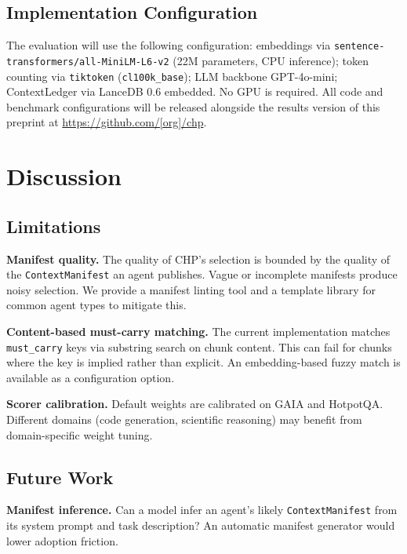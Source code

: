 \documentclass[11pt]{article}
\begin{document}
\subsection{Implementation Configuration}

The evaluation will use the following configuration:
embeddings via \texttt{sentence-transformers/all-MiniLM-L6-v2} (22M
parameters, CPU inference); token counting via \texttt{tiktoken}
(\texttt{cl100k\_base}); LLM backbone GPT-4o-mini; ContextLedger via
LanceDB 0.6 embedded. No GPU is required. All code and benchmark
configurations will be released alongside the results version of this
preprint at \url{https://github.com/[org]/chp}.

\section{Discussion}
\label{sec:discussion}

\subsection{Limitations}

\textbf{Manifest quality.} The quality of CHP's selection is bounded by the
quality of the \texttt{ContextManifest} an agent publishes. Vague or
incomplete manifests produce noisy selection. We provide a manifest linting
tool and a template library for common agent types to mitigate this.

\textbf{Content-based must-carry matching.} The current implementation
matches \texttt{must\_carry} keys via substring search on chunk content. This
can fail for chunks where the key is implied rather than explicit. An
embedding-based fuzzy match is available as a configuration option.

\textbf{Scorer calibration.} Default weights are calibrated on GAIA and
HotpotQA. Different domains (code generation, scientific reasoning) may
benefit from domain-specific weight tuning.

\subsection{Future Work}

\textbf{Manifest inference.} Can a model infer an agent's likely
\texttt{ContextManifest} from its system prompt and task description? An
automatic manifest generator would lower adoption friction.
\end{document}
